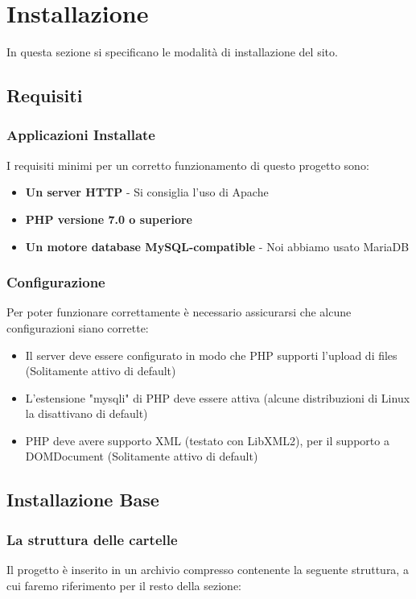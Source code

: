 \section{Installazione}
In questa sezione si specificano le modalità di installazione del sito.

\subsection{Requisiti}
\subsubsection{Applicazioni Installate}
I requisiti minimi per un corretto funzionamento di questo progetto sono:
\begin{itemize}
\item \textbf{Un server HTTP} - Si consiglia l'uso di Apache
\item \textbf{PHP versione 7.0 o superiore}
\item \textbf{Un motore database MySQL-compatible} - Noi abbiamo usato MariaDB
\end{itemize}
\subsubsection{Configurazione}
Per poter funzionare correttamente è necessario assicurarsi che alcune configurazioni siano corrette:
\begin{itemize}
\item Il server deve essere configurato in modo che PHP supporti l'upload di files (Solitamente attivo di default)
\item L'estensione "mysqli" di PHP deve essere attiva (alcune distribuzioni di Linux la disattivano di default)
\item PHP deve avere supporto XML (testato con LibXML2), per il supporto a DOMDocument (Solitamente attivo di default)
\end{itemize}

\pagebreak

\subsection{Installazione Base}
\subsubsection{La struttura delle cartelle}
Il progetto è inserito in un archivio compresso contenente la seguente struttura, a cui faremo riferimento per il resto della sezione:
